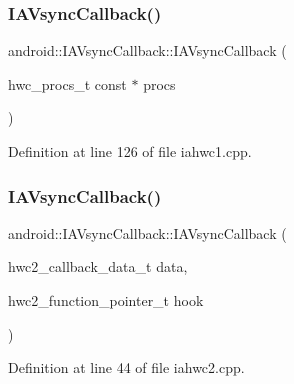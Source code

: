 \subsubsection{\texorpdfstring{I\+A\+Vsync\+Callback()}{IAVsyncCallback()}\hspace{0.1cm}{\footnotesize\ttfamily [1/2]}}
{\footnotesize\ttfamily android\+::\+I\+A\+Vsync\+Callback\+::\+I\+A\+Vsync\+Callback (\begin{DoxyParamCaption}\item[{hwc\+\_\+procs\+\_\+t const $\ast$}]{procs }\end{DoxyParamCaption})\hspace{0.3cm}{\ttfamily [inline]}}



Definition at line 126 of file iahwc1.\+cpp.


\begin{DoxyCode}{0}
\end{DoxyCode}
\mbox{\label{classandroid_1_1IAVsyncCallback_a52e1c4e87b7667af7d10a94079785716}} 
\subsubsection{\texorpdfstring{I\+A\+Vsync\+Callback()}{IAVsyncCallback()}\hspace{0.1cm}{\footnotesize\ttfamily [2/2]}}
{\footnotesize\ttfamily android\+::\+I\+A\+Vsync\+Callback\+::\+I\+A\+Vsync\+Callback (\begin{DoxyParamCaption}\item[{hwc2\+\_\+callback\+\_\+data\+\_\+t}]{data,  }\item[{hwc2\+\_\+function\+\_\+pointer\+\_\+t}]{hook }\end{DoxyParamCaption})\hspace{0.3cm}{\ttfamily [inline]}}



Definition at line 44 of file iahwc2.\+cpp.


\begin{DoxyCode}{0}
\end{DoxyCode}


